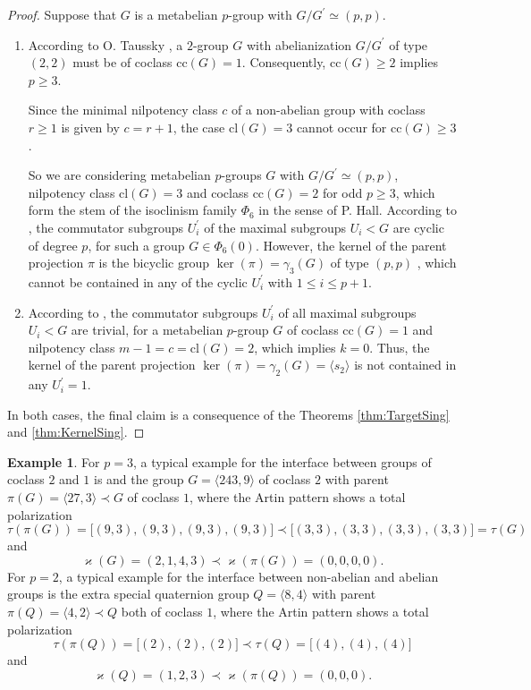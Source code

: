 \documentclass{amsart}
\theoremstyle{definition}
\newtheorem{example}{Example}[section]
\numberwithin{equation}{section}
\begin{document}
\begin{proof}
Suppose that \(G\) is a metabelian \(p\)-group with \(G/G^\prime\simeq (p,p)\).

\begin{enumerate}

\item
According to O. Taussky
\cite{Ta},
a \(2\)-group \(G\) with abelianization \(G/G^\prime\) of type \((2,2)\)
must be of coclass \(\mathrm{cc}(G)=1\).
Consequently, \(\mathrm{cc}(G)\ge 2\) implies \(p\ge 3\).

Since the minimal nilpotency class \(c\) of a non-abelian group with coclass \(r\ge 1\)
is given by \(c=r+1\),
the case \(\mathrm{cl}(G)=3\) cannot occur for \(\mathrm{cc}(G)\ge 3\).

So we are considering metabelian \(p\)-groups \(G\) with \(G/G^\prime\simeq (p,p)\),
nilpotency class \(\mathrm{cl}(G)=3\) and coclass \(\mathrm{cc}(G)=2\) for odd \(p\ge 3\),
which form the stem of the isoclinism family \(\Phi_6\) in the sense of P. Hall.
According to
\cite[Lem.3.1, p.446]{Ma4},
the commutator subgroups \(U_i^\prime\) of the maximal subgroups \(U_i<G\)
are cyclic of degree \(p\), for such a group \(G\in\Phi_6(0)\).
However, the kernel of the parent projection \(\pi\) is the bicyclic group
\(\ker(\pi)=\gamma_3(G)\) of type \((p,p)\)
\cite[\S\ 3.5, p.445]{Ma4},
which cannot be contained in any of the cyclic \(U_i^\prime\) with \(1\le i\le p+1\).

\item
According to
\cite[Cor.3.1, p.476]{Ma1},
the commutator subgroups \(U_i^\prime\) of all maximal subgroups \(U_i<G\) are trivial,
for a metabelian \(p\)-group \(G\)
of coclass \(\mathrm{cc}(G)=1\) and nilpotency class \(m-1=c=\mathrm{cl}(G)=2\),
which implies \(k=0\).
Thus, the kernel of the parent projection \(\ker(\pi)=\gamma_2(G)=\langle s_2\rangle\)
is not contained in any \(U_i^\prime=1\).

\end{enumerate}

\noindent
In both cases,
the final claim is a consequence of the Theorems
\ref{thm:TargetSing}
and
\ref{thm:KernelSing}.
\end{proof}


\begin{example}
\label{exm:Extreme}
For \(p=3\), a typical example
for the interface between groups of coclass \(2\) and \(1\) is
and the group \(G=\langle 243,9\rangle\) of coclass \(2\)
with parent \(\pi(G)=\langle 27,3\rangle\prec G\) of coclass \(1\),
where the Artin pattern shows a total polarization
\[\tau(\pi(G))=\lbrack (9,3),(9,3),(9,3),(9,3)\rbrack\prec\lbrack (3,3),(3,3),(3,3),(3,3)\rbrack=\tau(G)\]
and
\[\varkappa(G)=(2,1,4,3)\prec\varkappa(\pi(G))=(0,0,0,0).\]
For \(p=2\), a typical example
for the interface between non-abelian and abelian groups is 
the extra special quaternion group \(Q=\langle 8,4\rangle\)
with parent \(\pi(Q)=\langle 4,2\rangle\prec Q\) both of coclass \(1\),
where the Artin pattern shows a total polarization
\[\tau(\pi(Q))=\lbrack (2),(2),(2)\rbrack\prec\tau(Q)=\lbrack (4),(4),(4)\rbrack\]
and
\[\varkappa(Q)=(1,2,3)\prec\varkappa(\pi(Q))=(0,0,0).\]
\end{example}
\end{document}
